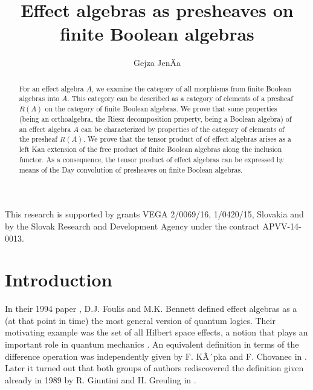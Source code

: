 \documentclass[smallextended]{svjour3}
\begin{document}
\title{Effect algebras as presheaves on finite Boolean algebras}
\author{Gejza JenÄa}
\maketitle
\begin{abstract}
For an effect algebra $A$, we examine the category
of all morphisms from finite Boolean algebras into $A$.
This category can be described as a category
of elements of a presheaf $R(A)$
on the category of finite Boolean algebras.
We prove that some properties (being an orthoalgebra,
the Riesz decomposition property, being a Boolean algebra) of an effect algebra $A$ 
can be characterized by properties of the category of elements
of the presheaf $R(A)$. We prove that the tensor product of
of effect algebras arises as a left Kan extension of the
free product of finite Boolean algebras along the
inclusion functor. As a consequence, the tensor
product of effect algebras can be expressed by means of the Day convolution
of presheaves on finite Boolean algebras.
\end{abstract}
\begin{acknowledgements}
This research is supported by grants VEGA 2/0069/16, 1/0420/15,
Slovakia and by the Slovak Research and Development Agency under the contract
APVV-14-0013.
\end{acknowledgements}

\section{Introduction}

In their 1994 paper \cite{FouBen:EAaUQL}, D.J. Foulis and M.K. Bennett defined
effect algebras as a (at that point in time) the most general version of
quantum logics. Their motivating example was the set of all Hilbert space
effects, a notion that plays an important role in quantum mechanics
\cite{Lud:FoQM,BusLahMit:TQToM}. An equivalent definition in terms of the difference
operation was independently given by F. KÃ´pka and F. Chovanec in \cite{KopCho:DP}. Later
it turned out that both groups of authors rediscovered the definition given already in 1989
by R. Giuntini and H. Greuling in \cite{GiuGre:TaFLfUP}.
\end{document}
